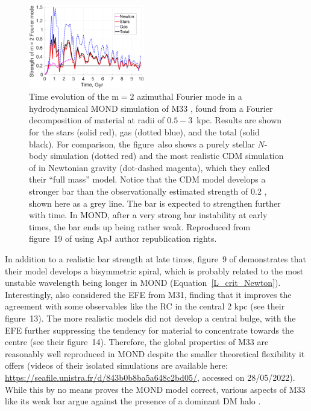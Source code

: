 \documentclass[fleqn,usenatbib,useAMS]{mnras} %
\begin{document}
\begin{figure}
	\centering
	\includegraphics[width=0.45\textwidth]{Banik_2020_M33_Figure_19}
	\caption{Time evolution of the $\mathrm{m} = 2$ azimuthal Fourier mode in a hydrodynamical MOND simulation of M33 \citep{Banik_2020_M33}, found from a Fourier decomposition of material at radii of $0.5-3$~kpc. Results are shown for the stars (solid red), gas (dotted blue), and the total (solid black). For comparison, the figure~also shows a purely stellar $N$-body simulation (dotted red) and the most realistic CDM simulation of \citet{Sellwood_2019} in Newtonian gravity (dot-dashed magenta), which they called their ``full mass'' model. Notice that the CDM model develops a stronger bar than the observationally estimated strength of 0.2 \citep{Corbelli_Walterbos_2007}, shown here as a grey line. The bar is expected to strengthen further with time. In MOND, after a very strong bar instability at early times, the bar ends up being rather weak. Reproduced from figure~19 of \citet{Banik_2020_M33} using ApJ author republication rights.}
	\label{Banik_2020_M33_Figure_bar_strength}
\end{figure}

In addition to a realistic bar strength at late times, figure~9 of \citet{Banik_2020_M33} demonstrates that their model develops a bisymmetric spiral, which is probably related to the most unstable wavelength being longer in MOND (Equation~\ref{L_crit_Newton}). Interestingly, \citet{Banik_2020_M33} also considered the EFE from M31, finding that it improves the agreement with some observables like the RC in the central 2 kpc (see their figure~13). The more realistic models did not develop a central bulge, with the EFE further suppressing the tendency for material to concentrate towards the centre (see their figure~14). Therefore, the global properties of M33 are reasonably well reproduced in MOND despite the smaller theoretical flexibility it offers (videos of their isolated simulations are available here: \href{https://seafile.unistra.fr/d/843b0b8ba5a648c2bd05/}{https://seafile.unistra.fr/d/843b0b8ba5a648c2bd05/}, accessed on 28/05/2022). While this by no means proves the MOND model correct, various aspects of M33 like its weak bar argue against the presence of a dominant DM halo \citep{Sellwood_2019}.
\end{document}
